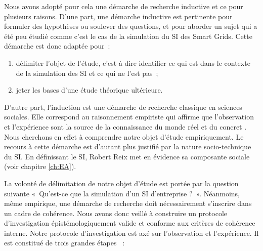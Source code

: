 Nous avons adopté pour cela une démarche de recherche inductive et ce pour plusieurs raisons.
D'une part, une démarche inductive est pertinente pour formuler des hypothèses ou soulever des questions,
et pour aborder un sujet qui a été peu étudié comme c'est le cas de la simulation du SI des Smart Grids.	
Cette démarche est donc adaptée pour~: 
\begin{enumerate}
	\item délimiter l'objet de l'étude, c'est à dire identifier ce qui est dans le 
contexte de la simulation des SI et ce qui ne l'est pas~;
	\item jeter les bases d'une étude théorique ultérieure.
\end{enumerate}
	
D'autre part, l'induction est une démarche de recherche classique en sciences 
sociales. Elle correspond au raisonnement empiriste qui affirme que 
l'observation et l'expérience sont la source de la connaissance du monde réel et 
du concret \cite{madeleine2001methodes}. Nous cherchons en effet à comprendre 
notre objet d'étude empiriquement. Le recours à cette démarche est d'autant plus 
justifié par la nature socio-technique du SI. En définissant le SI, Robert Reix 
met en évidence sa composante sociale (voir chapitre \ref{ch:EA}). 
	

La volonté de délimitation de notre objet d'étude est portée par la question 
suivante «~Qu'est-ce que la simulation d'un SI d'entreprise ?~». Néanmoins, même 
empirique, une démarche de recherche doit nécessairement s'inscrire dans un 
cadre de cohérence. Nous avons donc veillé à construire un protocole 
d'investigation épistémologiquement valide et conforme aux critères de cohérence 
interne. Notre protocole d'investigation est axé sur l'observation et 
l'expérience. Il est constitué de trois grandes étapes ~:
		
